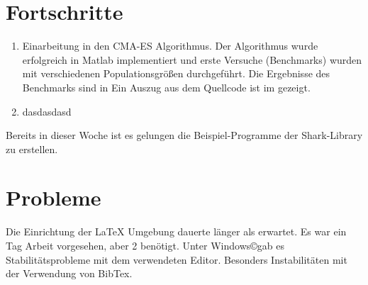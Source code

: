 ﻿\documentclass[a4paper,12pt,fleqn]{scrartcl}
\begin{document}
\section[Fortschritte]{Fortschritte}
\begin{enumerate}
 \item Einarbeitung in den CMA-ES Algorithmus. Der Algorithmus wurde erfolgreich in Matlab
      implementiert und erste Versuche (Benchmarks) wurden mit verschiedenen Populationsgrößen durchgeführt. Die Ergebnisse des Benchmarks sind in
      Ein Auszug aus dem Quellcode ist im  gezeigt.
 \item
        dasdasdasd
\end{enumerate}

Bereits in dieser Woche ist es gelungen die Beispiel-Programme der Shark-Library zu erstellen.

\section[Probleme]{Probleme}
Die Einrichtung der \LaTeX{} Umgebung dauerte länger als erwartet. Es war ein Tag Arbeit
vorgesehen, aber 2 benötigt. \newline
Unter Windows\copyright gab es Stabilitätsprobleme mit dem verwendeten Editor. Besonders Instabilitäten mit der Verwendung von BibTex.


\end{document}
